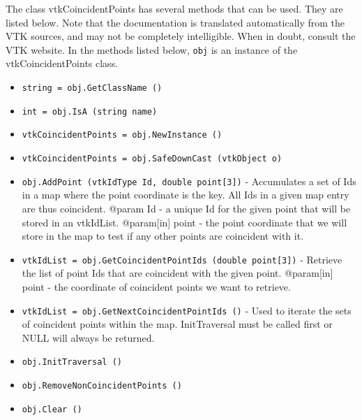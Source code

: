 The class vtkCoincidentPoints has several methods that can be used.
  They are listed below.
Note that the documentation is translated automatically from the VTK sources,
and may not be completely intelligible.  When in doubt, consult the VTK website.
In the methods listed below, \verb|obj| is an instance of the vtkCoincidentPoints class.
\begin{itemize}
\item  \verb|string = obj.GetClassName ()|

\item  \verb|int = obj.IsA (string name)|

\item  \verb|vtkCoincidentPoints = obj.NewInstance ()|

\item  \verb|vtkCoincidentPoints = obj.SafeDownCast (vtkObject o)|

\item  \verb|obj.AddPoint (vtkIdType Id, double point[3])| -  Accumulates a set of Ids in a map where the point coordinate
 is the key. All Ids in a given map entry are thus coincident.
 @param Id - a unique Id for the given  point that will be stored in an vtkIdList.
 @param[in] point - the point coordinate that we will store in the map to test if any other points are
 coincident with it.

\item  \verb|vtkIdList = obj.GetCoincidentPointIds (double point[3])| -  Retrieve the list of point Ids that are coincident with the given  point.
 @param[in] point - the coordinate of coincident points we want to retrieve.

\item  \verb|vtkIdList = obj.GetNextCoincidentPointIds ()| -  Used to iterate the sets of coincident points within the map.
 InitTraversal must be called first or NULL will always be returned.

\item  \verb|obj.InitTraversal ()|

\item  \verb|obj.RemoveNonCoincidentPoints ()|

\item  \verb|obj.Clear ()|

\end{itemize}
